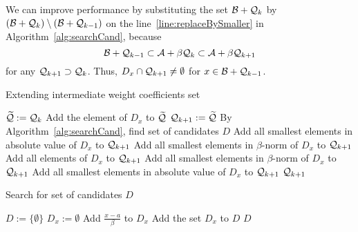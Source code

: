 We can improve performance by substituting the set $\mathcal{B} + \mathcal{Q}_{k}$ by $(\mathcal{B} + \mathcal{Q}_{k})\setminus (\mathcal{B} + \mathcal{Q}_{k-1})$ on the line~\ref{line:replaceBySmaller} in Algorithm~\ref{alg:searchCand}, because
$$
\mathcal{B} + \mathcal{Q}_{k-1} \subset \mathcal{A} + \beta \mathcal{Q}_{k} \subset \mathcal{A} + \beta \mathcal{Q}_{k+1}
$$
for any $\mathcal{Q}_{k+1} \supset \mathcal{Q}_{k}$. Thus, $D_x \cap \mathcal{Q}_{k+1} \neq \emptyset$ for  $x\in \mathcal{B} + \mathcal{Q}_{k-1}$.


\begin{algorithm}
  \caption{Extending intermediate weight coefficients set}
    \label{alg:extendWeightCoefSet}
  \begin{algorithmic}[1]
    \STATE $\widetilde{\mathcal{Q}}:=\mathcal{Q}_{k}$
		    	\STATE Add the element of $D_x$ to $\widetilde{\mathcal{Q}}$
			\ENDIF
		\ENDFOR
	\ENDIF
    \STATE $\mathcal{Q}_{k+1}:=\widetilde{\mathcal{Q}}$
    \STATE By Algorithm~\ref{alg:searchCand}, find set of candidates $D$
	        	\STATE Add all smallest elements in absolute value of $D_x$ to $\mathcal{Q}_{k+1}$
	        	\STATE Add all smallest elements in $\beta$-norm of $D_x$ to $\mathcal{Q}_{k+1}$
	        	\STATE Add all elements of $D_x$ to $\mathcal{Q}_{k+1}$
	        	\STATE Add all smallest elements in $\beta$-norm of $D_x$ to $\mathcal{Q}_{k+1}$
	        	\STATE Add all smallest elements in absolute value of $D_x$ to $\mathcal{Q}_{k+1}$ 
	        \ENDIF
        \ENDIF
    \ENDFOR
    \RETURN $\mathcal{Q}_{k+1}$
  \end{algorithmic}
\end{algorithm}



\begin{algorithm}
  \caption{Search for set of candidates $D$}
    \label{alg:searchCand}
  \begin{algorithmic}[1]
    \STATE $D:=\{\emptyset\}$
     \label{line:replaceBySmaller}
      \STATE $D_x:=\emptyset$
              \STATE Add $\frac{x-a}{\beta}$ to $D_x$
            \ENDIF
      \ENDFOR 
      \STATE Add the set $D_x$ to $D$
  \ENDFOR
  \RETURN $D$
  \end{algorithmic}
\end{algorithm}  
